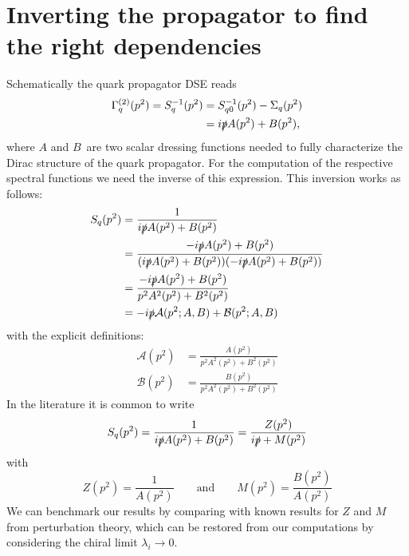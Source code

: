\documentclass[digital, %
			   openright, %
			   parskip=half,
			   11pt]{mythesis}
\begin{document}
\pagestyle{plain}

\section*{Inverting the propagator to find the right dependencies}
Schematically the quark propagator DSE reads 
\begin{equation}
\begin{aligned}
		\Gamma^{(2)}_q(p^2) = S^{-1}_q(p^2) &= S_{q0}^{-1}(p^2) - \Sigma_q(p^2) \\
		&= i\slashed{p} A(p^2) + B(p^2),
\end{aligned}
\end{equation}
where $A$ and $B$\ are two scalar dressing functions needed to fully characterize the Dirac structure of the quark propagator. 
For the computation of the respective spectral functions we need the inverse of this expression. This inversion works as follows:
\begin{equation}
\begin{aligned}
	 S_q(p^2) &= \frac{1}{i\slashed{p} A(p^2) + B(p^2)}  \\
		&= \frac{-i\slashed{p} A(p^2) + B(p^2)}{(i\slashed{p} A(p^2) + B(p^2))(-i\slashed{p} A(p^2) + B(p^2))} \\
		&= \frac{-i\slashed{p} A(p^2) + B(p^2)}{p^2A^2(p^2) + B^2(p^2)} \\
		&= -i\slashed{p} \mathcal{A}(p^2; A,B) + \mathcal{B}(p^2; A,B)
\end{aligned}
\end{equation}
with the explicit definitions:
\begin{equation}
	\begin{aligned}
		\mathcal{A}(p^2) &= \frac{A(p^2)}{p^2A^2(p^2) + B^2(p^2)} \\
		\mathcal{B}(p^2) &= \frac{B(p^2)}{p^2A^2(p^2) + B^2(p^2)}
	\end{aligned}
\end{equation}
\color{MScRed} In the literature it is common to write 
\begin{equation}
	S_q(p^2) =  \frac{1}{i\slashed{p} A(p^2) + B(p^2)} = \frac{Z(p^2)}{i\slashed{p} + M(p^2)}
\end{equation} 
with 
\begin{equation}
	 Z(p^2) = \frac{1}{A(p^2)}\qquad \text{and}\qquad M(p^2) = \frac{B(p^2)}{A(p^2)}
\end{equation}
We can benchmark our results by comparing with known results for $Z$ and $M$ from perturbation theory, which can be restored from our computations by considering the chiral limit $\lambda_i \rightarrow 0$.\\
\end{document}
